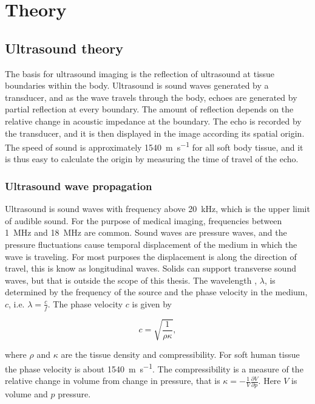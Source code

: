 \section{Theory}
\subsection{Ultrasound theory}
The basis for ultrasound imaging is the reflection of ultrasound at tissue boundaries within the body. Ultrasound is sound waves generated by a transducer, and as the wave travels through the body, echoes are generated by partial reflection at every boundary. The amount of reflection depends on the relative change in acoustic impedance at the boundary. The echo is recorded by the transducer, and it is then displayed in the image according its spatial origin. The speed of sound is approximately \SI{1540}{\metre\per\second} for all soft body tissue, and it is thus easy to calculate the origin by measuring the time of travel of the echo. 

\subsubsection{Ultrasound wave propagation}
Ultrasound is sound waves with frequency above \SI{20}{\kilo\hertz}, which is the upper limit of audible sound. For the purpose of medical imaging, frequencies between \SI{1}{\mega\hertz} and \SI{18}{\mega\hertz} are common. Sound waves are pressure waves, and the pressure fluctuations cause temporal displacement of the medium in which the wave is traveling. For most purposes the displacement is along the direction of travel, this is know as longitudinal waves. Solids can support transverse sound waves, but that is outside the scope of this thesis.  The wavelength , $\lambda$, is determined by the frequency of the source and the phase velocity in the medium, $c$, i.e. $\lambda= \frac{c}{f}$. The phase velocity $c$ is given by

\begin{equation}
\label{phace velocity}
c = \sqrt{\frac{1}{\rho \kappa}},
\end{equation}

where $\rho$ and $\kappa$ are the tissue density and compressibility. For soft human tissue the phase velocity is about \SI{1540}{\metre\per\second}.%
The compressibility is a measure of the relative change in volume from change in pressure, that is $\kappa = -\frac{1}{V}\frac{\partial V}{\partial p}$. Here $V$ is volume and $p$ pressure. 

